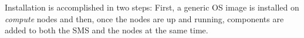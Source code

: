 Installation is accomplished in two steps: First,  a generic OS
image is installed on {\em compute} nodes and then, once the nodes are up
and running, \OHPC{} components are added to both the SMS and the nodes at the
same time.